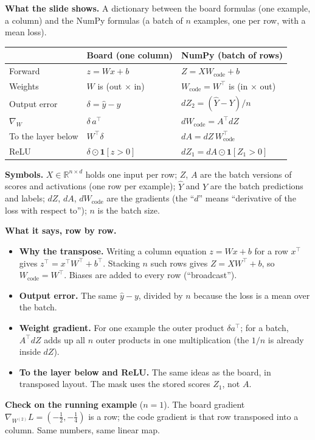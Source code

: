 \textbf{What the slide shows.} A dictionary between the board formulas (one example, a column) and the NumPy formulas (a batch of $n$ examples, one per row, with a mean loss).

\begin{center}
\begin{tabular}{p{3.5cm}p{3.9cm}p{5.6cm}}
\toprule
 & Board (one column) & NumPy (batch of rows) \\
\midrule
Forward & $z=Wx+b$ & $Z=XW_{\text{code}}+b$ \\
Weights & $W$ is (out $\times$ in) & $W_{\text{code}}=W^\top$ is (in $\times$ out) \\
Output error & $\delta=\hat{y}-y$ & $dZ_2=(\hat{Y}-Y)/n$ \\
$\nabla_W$ & $\delta\,a^\top$ & $dW_{\text{code}}=A^\top dZ$ \\
To the layer below & $W^\top\delta$ & $dA=dZ\,W_{\text{code}}^\top$ \\
ReLU & $\delta\odot\mathbf{1}[z>0]$ & $dZ_1=dA\odot\mathbf{1}[Z_1>0]$ \\
\bottomrule
\end{tabular}
\end{center}

\textbf{Symbols.} $X\in\mathbb{R}^{n\times d}$ holds one input per row; $Z$, $A$ are the batch versions of scores and activations (one row per example); $\hat{Y}$ and $Y$ are the batch predictions and labels; $dZ$, $dA$, $dW_{\text{code}}$ are the gradients (the ``$d$'' means ``derivative of the loss with respect to''); $n$ is the batch size.

\textbf{What it says, row by row.}
\begin{itemize}
\item \textbf{Why the transpose.} Writing a column equation $z=Wx+b$ for a row $x^\top$ gives $z^\top=x^\top W^\top+b^\top$. Stacking $n$ such rows gives $Z=XW^\top+b$, so $W_{\text{code}}=W^\top$. Biases are added to every row (``broadcast'').
\item \textbf{Output error.} The same $\hat{y}-y$, divided by $n$ because the loss is a mean over the batch.
\item \textbf{Weight gradient.} For one example the outer product $\delta a^\top$; for a batch, $A^\top dZ$ adds up all $n$ outer products in one multiplication (the $1/n$ is already inside $dZ$).
\item \textbf{To the layer below and ReLU.} The same ideas as the board, in transposed layout. The mask uses the stored scores $Z_1$, not $A$.
\end{itemize}
\textbf{Check on the running example} ($n=1$). The board gradient $\nabla_{W^{(2)}}L=(-\tfrac12,-\tfrac14)$ is a row; the code gradient is that row transposed into a column. Same numbers, same linear map.

